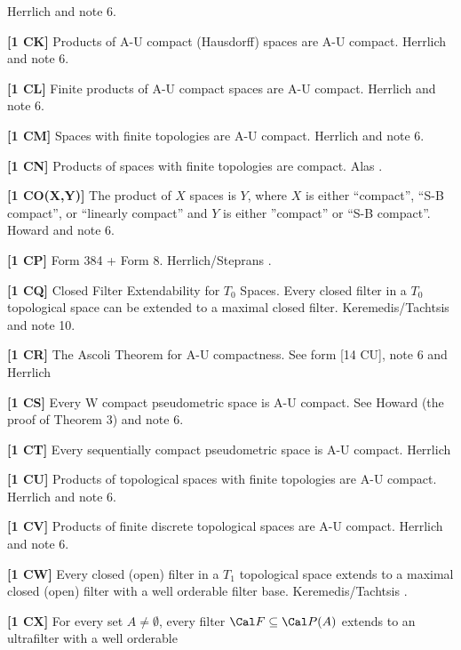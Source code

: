 \ac{Herrlich} \cite{1996a} and note 6.
\smallskip
\item{}{\bf [1 CK]} Products of A-U compact (Hausdorff) spaces
are A-U compact.  \ac{Herrlich} \cite{1996a} and note 6.
\smallskip
\item{}{\bf [1 CL]} Finite products of A-U compact spaces are A-U
compact.  \ac{Herrlich} \cite{1996a} and note 6.
\smallskip
\item{}{\bf [1 CM]} Spaces with finite topologies are A-U compact.
\ac{Herrlich} \cite{1996a} and note 6.
\smallskip
\item{}{\bf [1 CN]} Products of spaces with finite topologies are
compact.  \ac{Alas} \cite{1969}.
\smallskip
\item{}{\bf [1 CO(X,Y)]} The product of $X$ spaces is $Y$,
where $X$ is either ``compact'', ``S-B compact'', or ``linearly compact''
and $Y$ is either ''compact'' or ``S-B compact''.  \ac{Howard}
\cite{1990} and note 6.
\smallskip
\item{}{\bf [1 CP]} Form 384 + Form 8.  \ac{Herrlich/Steprans}
\cite{1997}.
\smallskip
\item{}{\bf [1 CQ]} Closed Filter Extendability for $T_0$ Spaces.
Every closed filter in a $T_0$ topological space can be extended to
a maximal closed filter.  \ac{Keremedis/Tachtsis} \cite{1999b} and note
10.
\smallskip
\item{}{\bf [1 CR]} The Ascoli Theorem for A-U compactness. See form
[14 CU], note 6 and \ac{Herrlich} \cite{1997c}
\smallskip
\item{}{\bf [1 CS]} Every W compact pseudometric space is A-U compact.
See \ac{Howard} \cite{1990} (the proof of Theorem 3) and note 6.
\smallskip
\item{}{\bf [1 CT]} Every sequentially compact pseudometric space is
A-U compact.  \ac{Herrlich} \cite{1997a}
\smallskip
\item{}{\bf [1 CU]} Products of topological spaces with finite topologies
are A-U compact.  \ac{Herrlich} \cite{1997a} and note 6.
\smallskip
\item{}{\bf [1 CV]} Products of finite discrete topological spaces are
A-U compact. \ac{Herrlich} \cite{1996a} and note 6.
\smallskip
\item{}{\bf [1 CW]} Every closed (open) filter in a $T_1$ topological
space extends to a maximal closed (open) filter with a well orderable
filter base.  \ac{Keremedis/Tachtsis} \cite{2000}.
\smallskip
\item{}{\bf [1 CX]} For every set $A\ne\emptyset$, every filter $\Cal F
\subseteq \Cal P(A)$ extends to an ultrafilter with a well orderable
